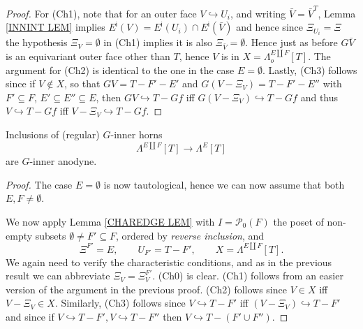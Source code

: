 \documentclass[a4paper,10pt,draft]{article}%
\begin{document}
\begin{proof}
	For (Ch1), note that for an outer face 
	$V \hookrightarrow U_i$, and writing $\bar{V} = \bar{V}^T$,
	Lemma \ref{INNINT LEM} implies
	$E^{\mathsf{i}}(V) = E^{\mathsf{i}}(U_i) \cap E^{\mathsf{i}}(\bar{V})$
	and hence since $\Xi_{U_i}=\Xi$ the 
	hypothesis $\Xi_{V} = \emptyset$ in (Ch1) implies it is also
	$\Xi_{\bar{V}} = \emptyset$.
	Hence just as before $G\bar{V}$ is an equivariant outer face other than $T$, hence $V$ is in $X=\Lambda_o^{E\amalg F}[T]$.
	The argument for (Ch2) is identical to the one in the case
	$E=\emptyset$.
	Lastly, (Ch3) follows since	if $V \not \in X$, so that
	$GV = T - F'-E'$ and $G(V - \Xi_V) = T-F'-E''$ with
	$F' \subseteq F$, $E' \subseteq E'' \subseteq E$,
	then $GV \hookrightarrow T-Gf$ iff $G(V - \Xi_V) \hookrightarrow T-Gf$
	and thus $V \hookrightarrow T-Gf$ iff $V - \Xi_V \hookrightarrow T-Gf$.
\end{proof}


\begin{proposition}\label{REG_HORN_PROP}
Inclusions of (regular) $G$-inner horns
\begin{equation}
	\Lambda^{E \amalg F}[T] \to \Lambda^{E}[T]
\end{equation}
are $G$-inner anodyne.
\end{proposition}

\begin{proof}
The case $E = \emptyset$ is now tautological,
hence we can now assume that both $E,F \neq \emptyset$.

We now apply Lemma \ref{CHAREDGE LEM} with 
$I = \mathcal{P}_0(F)$
the poset of non-empty subsets $\emptyset \neq F' \subseteq F$, ordered by \textit{reverse inclusion}, and
\[
	\Xi^{F'} = E, \qquad
	U_{F'} = T - F', \qquad
	X=\Lambda^{E\amalg F}[T].
\]
We again need to verify the characteristic conditions,
and as in the previous result we can abbreviate
$\Xi_V = \Xi^{F'}_V$.
(Ch0) is clear. (Ch1) follows from an easier version of the argument in the previous proof.
(Ch2) follows since $V \in X$ iff $V-\Xi_V \in X$.
Similarly,
(Ch3) follows since 
$V \hookrightarrow T-F'$ iff $(V-\Xi_V) \hookrightarrow T-F'$
and since if
$V \hookrightarrow T-F',V \hookrightarrow T-F''$
then 
$V \hookrightarrow T-(F' \cup F'')$.
\end{proof}
\end{document}
